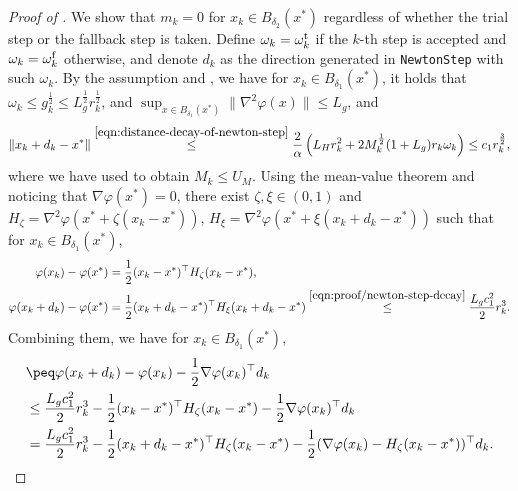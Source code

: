 \begin{proof}[Proof of ]
    We show that $m_k = 0$ for $x_k \in B_{\delta_2}(x^*)$ regardless of whether the trial step or the fallback step is taken.
    Define $\omega_k = \omega_k^{\mathrm{t}}$ if the $k$-th step is accepted and $\omega_k = \omega_k^{\mathrm{f}}$ otherwise, and denote $d_k$ as the direction generated in \texttt{NewtonStep} with such $\omega_k$. 
    By the assumption and ,
    we have for $x_k \in B_{\delta_1}(x^*)$, it holds that $\omega_k \leq g_k^{\frac{1}{2}} \leq L_g^{\frac{1}{2}} r_k^{\frac{1}{2}}$, 
    and $\sup_{x \in B_{\delta_1}(x^*)} \| \nabla^2\varphi(x) \| \leq L_g$, and 
    \begin{equation}
        \label{eqn:proof/newton-step-decay}
        \| x_k + d_k - x^* \| 
        \overset{\eqref{eqn:distance-decay-of-newton-step}}{\leq}  
        \frac{2}{\alpha}\left( 
            L_H r_k^2 + 2M_k^{\frac{1}{2}} (1 + L_g) r_k\omega_k
         \right) \leq c_1 r_k^{\frac{3}{2}},
    \end{equation}
    where we have used  to obtain $M_k \leq U_M$.
    Using the mean-value theorem and noticing that $\nabla \varphi(x^*) = 0$, 
    there exist $\zeta, \xi \in (0, 1)$ and $H_\zeta = \nabla^2 \varphi(x^* + \zeta (x_k - x^*))$, 
    $H_\xi = \nabla^2 \varphi(x^* + \xi(x_k + d_k - x^*))$ such that for $x_k \in B_{\delta_1}(x^*)$, 
    \begin{align*}
        \varphi(x_k) - \varphi(x^*) &= \frac{1}{2}(x_k - x^*)^\top H_\zeta(x_k - x^*), \\
        \varphi(x_k + d_k) - \varphi(x^*) &= \frac{1}{2}(x_k + d_k - x^*)^\top H_\xi(x_k + d_k - x^*)
         \overset{\eqref{eqn:proof/newton-step-decay}}{\leq} 
         \frac{L_gc_1^2}{2} r_k^3.
    \end{align*}
    Combining them, we have for $x_k \in B_{\delta_1}(x^*)$, 
    \begin{align}
        \nonumber
        &\peq \varphi(x_k +d_k) - \varphi(x_k) - \frac{1}{2} \nabla \varphi(x_k)^\top d_k \\
        \nonumber
        &\leq 
         \frac{L_gc_1^2}{2} r_k^{3} 
        -\frac{1}{2}(x_k - x^*)^\top H_\zeta(x_k - x^*)
        -\frac{1}{2}\nabla \varphi(x_k)^\top d_k
        \\
        &=
         \frac{L_gc_1^2}{2} r_k^{3}
        -\frac{1}{2}(x_k + d_k - x^*)^\top H_\zeta(x_k - x^*)
        -\frac{1}{2}(\nabla \varphi(x_k) - H_\zeta(x_k - x^*))^\top d_k 
        .
        \label{eqn:nonasymp-inexact-newton-line-search-final}

\end{align}
\end{proof}
